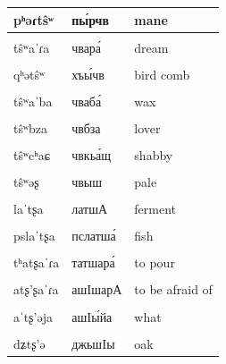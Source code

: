 \documentclass[
]{article}
\begin{document}
\begin{longtable}{l|l|l}
\hline
pʰəɾtŝʷ & пы́рчв & mane\\
\hline
\cellcolor{gray!6}{ˈpʂatŝʷɟa} & \cellcolor{gray!6}{пша́чвгьа} & \cellcolor{gray!6}{strong wind}\\
\hline
tŝʷaˈɾa & чвара́ & dream\\
\hline
\cellcolor{gray!6}{tʕaˈtŝʷa, tħaˈtŝʷa} & \cellcolor{gray!6}{тгIачва́, тхIачва́} & \cellcolor{gray!6}{family}\\
\hline
qʰətŝʷ & хъы́чв & bird comb\\
\hline
\cellcolor{gray!6}{tŝʷa} & \cellcolor{gray!6}{чва} & \cellcolor{gray!6}{skin}\\
\hline
tŝʷaˈba & чваба́ & wax\\
\hline
\cellcolor{gray!6}{tŝʷaˈħʷa} & \cellcolor{gray!6}{чвахIва́} & \cellcolor{gray!6}{stripe}\\
\hline
tŝʷbza & чвбза & lover\\
\hline
\cellcolor{gray!6}{tŝʷɟa} & \cellcolor{gray!6}{чвгьа} & \cellcolor{gray!6}{evil}\\
\hline
tŝʷcʰaɕ & чвкьа́щ & shabby\\
\hline
\cellcolor{gray!6}{tŝʷts’aˈɾa} & \cellcolor{gray!6}{чвцIара́} & \cellcolor{gray!6}{to scatter}\\
\hline
tŝʷəʂ & чвыш & pale\\
\hline
\cellcolor{gray!6}{alaɾˈtʂa} & \cellcolor{gray!6}{алартшА} & \cellcolor{gray!6}{alloyed}\\
\hline
laˈtʂa & латшА & ferment\\
\hline
\cellcolor{gray!6}{maˈtʂa} & \cellcolor{gray!6}{матшА} & \cellcolor{gray!6}{dishes}\\
\hline
pslaˈtʂa & пслатша́ & fish\\
\hline
\cellcolor{gray!6}{ˈakʷtʂaɡa} & \cellcolor{gray!6}{а́квтшага} & \cellcolor{gray!6}{watering-pot}\\
\hline
tʰatʂaˈɾa & татшара́ & to pour\\
\hline
\cellcolor{gray!6}{tʂa} & \cellcolor{gray!6}{тша} & \cellcolor{gray!6}{hay}\\
\hline
atʂ’ʂaˈɾa & ашIшарА & to be afraid of\\
\hline
\cellcolor{gray!6}{ˈakʰʷtʂ’aɾa} & \cellcolor{gray!6}{а́квшIара} & \cellcolor{gray!6}{to sit down}\\
\hline
aˈtʂ’əja & ашIы́йа & what\\
\hline
\cellcolor{gray!6}{bəlˈtʂ’ə} & \cellcolor{gray!6}{былшIы́} & \cellcolor{gray!6}{fuel}\\
\hline
dʑtʂ’ə & джьшIы & oak\\

\end{longtable}
\end{document}

